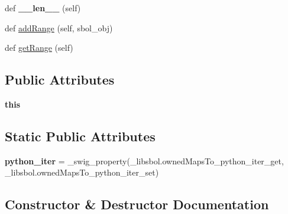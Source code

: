 \begin{DoxyCompactItemize}
\item 
def {\bfseries \+\_\+\+\_\+len\+\_\+\+\_\+} (self)\hypertarget{classsbol_1_1libsbol_1_1owned_maps_to_a1d292de3e1257f4b6f61805157db5eea}{}\label{classsbol_1_1libsbol_1_1owned_maps_to_a1d292de3e1257f4b6f61805157db5eea}

\item 
def \hyperlink{classsbol_1_1libsbol_1_1owned_maps_to_ae2dd505bc080233a9f3d1bb687493142}{add\+Range} (self, sbol\+\_\+obj)
\item 
def \hyperlink{classsbol_1_1libsbol_1_1owned_maps_to_ae188785c2b7b1261e52b3417286aa454}{get\+Range} (self)
\end{DoxyCompactItemize}
\subsection*{Public Attributes}
\begin{DoxyCompactItemize}
\item 
{\bfseries this}\hypertarget{classsbol_1_1libsbol_1_1owned_maps_to_ad5f06ca20294a6e1197915ed308b575b}{}\label{classsbol_1_1libsbol_1_1owned_maps_to_ad5f06ca20294a6e1197915ed308b575b}

\end{DoxyCompactItemize}
\subsection*{Static Public Attributes}
\begin{DoxyCompactItemize}
\item 
{\bfseries python\+\_\+iter} = \+\_\+swig\+\_\+property(\+\_\+libsbol.\+owned\+Maps\+To\+\_\+python\+\_\+iter\+\_\+get, \+\_\+libsbol.\+owned\+Maps\+To\+\_\+python\+\_\+iter\+\_\+set)\hypertarget{classsbol_1_1libsbol_1_1owned_maps_to_ade430632d54465a144b7e13b7a3af670}{}\label{classsbol_1_1libsbol_1_1owned_maps_to_ade430632d54465a144b7e13b7a3af670}

\end{DoxyCompactItemize}


\subsection{Constructor \& Destructor Documentation}
